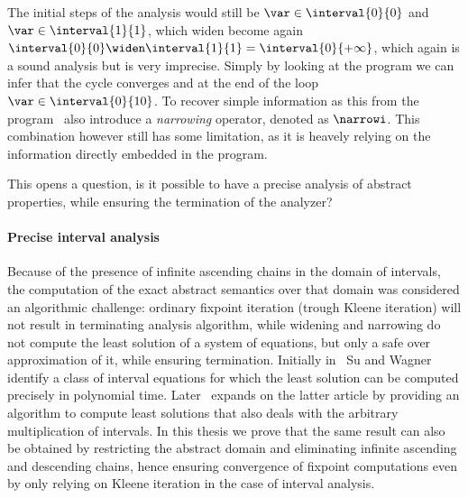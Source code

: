 The initial steps of the analysis would still be
\(\var \in \interval{0}{0}\) and \(\var \in \interval{1}{1}\), which
widen become again
\(\interval{0}{0}\widen\interval{1}{1} = \interval{0}{+\infty}\),
which again is a sound analysis but is very imprecise. Simply by
looking at the program we can infer that the cycle converges and at
the end of the loop \(\var\in\interval{0}{10}\). To recover simple
information as this from the program~\cite{10.1007/3-540-55844-6_142}
also introduce a \emph{narrowing} operator, denoted as \(\narrowi\).
This combination however still has some limitation, as it is heavely
relying on the information directly embedded in the program.

This opens a question, is it possible to have a precise analysis of
abstract properties, while ensuring the termination of the analyzer?

\paragraph*{Precise interval analysis} Because of the presence of
infinite ascending chains in the domain of intervals, the computation
of the exact abstract semantics over that domain was considered an
algorithmic challenge: ordinary fixpoint iteration (trough Kleene
iteration) will not result in terminating analysis algorithm, while
widening and narrowing do not compute the least solution of a system
of equations, but only a safe over approximation of it, while ensuring
termination. Initially in~\cite{SU2005122} Su and Wagner identify a
class of interval equations for which the least solution can be
computed precisely in polynomial time. Later~\cite{Gawlitza2009}
expands on the latter article by providing an algorithm to compute
least solutions that also deals with the arbitrary multiplication of
intervals.  In this thesis we prove that the same result can also be
obtained by restricting the abstract domain and eliminating infinite
ascending and descending chains, hence ensuring convergence of
fixpoint computations even by only relying on Kleene iteration in the
case of interval analysis.


